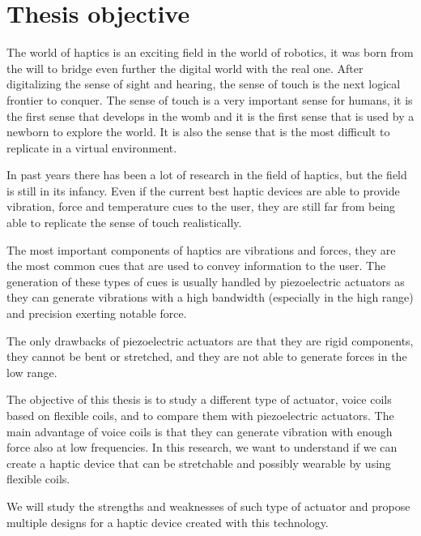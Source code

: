 \section{Thesis objective}

The world of haptics is an exciting field in the world of robotics, it was born from the will to bridge even further the digital world with the real one.
After digitalizing the sense of sight and hearing, the sense of touch is the next logical frontier to conquer.
The sense of touch is a very important sense for humans, it is the first sense that develops in the womb and it is the first sense that is used by a newborn to explore the world.
It is also the sense that is the most difficult to replicate in a virtual environment.

In past years there has been a lot of research in the field of haptics, but the field is still in its infancy.
Even if the current best haptic devices are able to provide vibration, force and temperature cues to the user, they are still far from being able to replicate the sense of touch realistically.

The most important components of haptics are vibrations and forces, they are the most common cues that are used to convey information to the user.
The generation of these types of cues is usually handled by piezoelectric actuators as they can generate vibrations with a high bandwidth (especially in the high range) and precision exerting notable force.

The only drawbacks of piezoelectric actuators are that they are rigid components, they cannot be bent or stretched, and they are not able to generate forces in the low range.

The objective of this thesis is to study a different type of actuator, voice coils based on flexible coils, and to compare them with piezoelectric actuators.
The main advantage of voice coils is that they can generate vibration with enough force also at low frequencies. 
In this research, we want to understand if we can create a haptic device that can be stretchable and possibly wearable by using flexible coils.

We will study the strengths and weaknesses of such type of actuator and propose multiple designs for a haptic device created with this technology.

\newpage